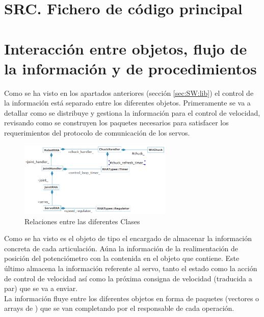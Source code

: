 \section{SRC. Fichero de código principal} \label{sec:SW:src}

\section{Interacción entre objetos, flujo de la información y de procedimientos} \label{sec:SW:interacion_informacion_proced}

	Como se ha visto en los apartados anteriores (sección \ref{sec:SW:lib}) el control de la información está separado entre los diferentes objetos. Primeramente se va a detallar como se distribuye y gestiona la información para el control de velocidad, revisando como se construyen los paquetes necesarios para satisfacer los requerimientos del protocolo de comunicación de los servos.
	\\ 
	
	\begin{figure}[H]
		\centering
		\includegraphics[width=0.65\textwidth]{figuras/Imagenes_SW/class_relation.png}   
		\caption{Relaciones entre las diferentes Clases }
		\label{fig:SW:class_relation}
	\end{figure}
	
	Como se ha visto es el objeto de tipo  el encargado de almacenar la información concreta de cada articulación. Aúna la información de la realimentación de posición del potenciómetro con la contenida en el objeto  que contiene. Este último almacena la información referente al servo, tanto el estado como la acción de control de velocidad así como la próxima consigna de velocidad (traducida a par) que se va a enviar.
	\\ 
	
	La información fluye entre los diferentes objetos en forma de paquetes (vectores o arrays de ) que se van completando por el responsable de cada operación.
	\\ 

